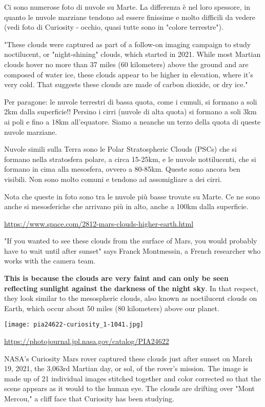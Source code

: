 \documentclass[a4paper,10pt,openany,oneside]{memoir}
\begin{document}
Ci sono numerose foto di nuvole su Marte. La differenza è nel loro spessore, in quanto le nuvole marziane tendono ad essere finissime e molto difficili da vedere (vedi foto di Curiosity - occhio, quasi tutte sono in "colore terrestre").

"These clouds were captured as part of a follow-on imaging campaign to study noctilucent, or "night-shining" clouds, which started in 2021. While most Martian clouds hover no more than 37 miles (60 kilometers) above the ground and are composed of water ice, these clouds appear to be higher in elevation, where it's very cold. That suggests these clouds are made of carbon dioxide, or dry ice."

Per paragone: le nuvole terrestri di bassa quota, come i cumuli, si formano a soli 2km dalla superficie!! Persino i cirri (nuvole di alta quota) si formano a soli 3km ai poli e fino a 18km all'equatore. Siamo a neanche un terzo della quota di queste nuvole marziane.

Nuvole simili sulla Terra sono le Polar Stratospheric Clouds (PSCs) che si formano nella stratosfera polare, a circa 15-25km, e le nuvole nottilucenti, che si formano in cima alla mesosfera, ovvero a 80-85km. Queste sono ancora ben visibili. Non sono molto comuni e tendono ad assomigliare a dei cirri.

Nota che queste in foto sono tra le nuvole più basse trovate su Marte. Ce ne sono anche si mesosferiche che arrivano più in alto, anche a 100km dalla superficie.

\url{https://www.space.com/2812-mars-clouds-higher-earth.html}

"If you wanted to see these clouds from the surface of Mars, you would probably have to wait until after sunset" says Franck Montmessin, a French researcher who works with the camera team.

\textbf{This is because the clouds are very faint and can only be seen reflecting sunlight against the darkness of the night sky}. In that respect, they look similar to the mesospheric clouds, also known as noctilucent clouds on Earth, which occur about 50 miles (80 kilometers) above our planet.



\texttt{[image: pia24622-curiosity\_1-1041.jpg]}

\url{https://photojournal.jpl.nasa.gov/catalog/PIA24622}

NASA's Curiosity Mars rover captured these clouds just after sunset on March 19, 2021, the 3,063rd Martian day, or sol, of the rover's mission. The image is made up of 21 individual images stitched together and color corrected so that the scene appears as it would to the human eye. The clouds are drifting over "Mont Mercou," a cliff face that Curiosity has been studying.
\end{document}
